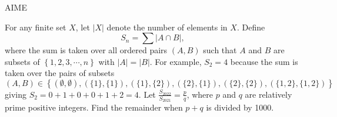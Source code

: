 \documentclass[14pt,aspectratio=169]{beamer}
\begin{document}
\begin{frame}{AIME}
	\begin{tcolorbox}[colback=white,colframe=black,boxrule=0.5pt]
		\small
		For any finite set $X$, let $| X |$ denote the number of elements in $X$. Define \[S_n = \sum | A \cap B | ,\] where the sum is taken over all ordered pairs $(A, B)$ such that $A$ and $B$ are subsets of $\left\{ 1 , 2 , 3, \cdots , n \right\}$ with $|A| = |B|$. For example, $S_2 = 4$ because the sum is taken over the pairs of subsets \[(A, B) \in \left\{ (\emptyset, \emptyset) , ( \{1\} , \{1\} ), ( \{1\} , \{2\} ) , ( \{2\} , \{1\} ) , ( \{2\} , \{2\} ) , ( \{1 , 2\} , \{1 , 2\} ) \right\}\] giving $S_2 = 0 + 1 + 0 + 0 + 1 + 2 = 4$. Let $\frac{S_{2022}}{S_{2021}} = \frac{p}{q}$, where $p$ and $q$ are relatively prime positive integers. Find the remainder when $p + q$ is divided by 1000.
	\end{tcolorbox}
\end{frame}
\end{document}
